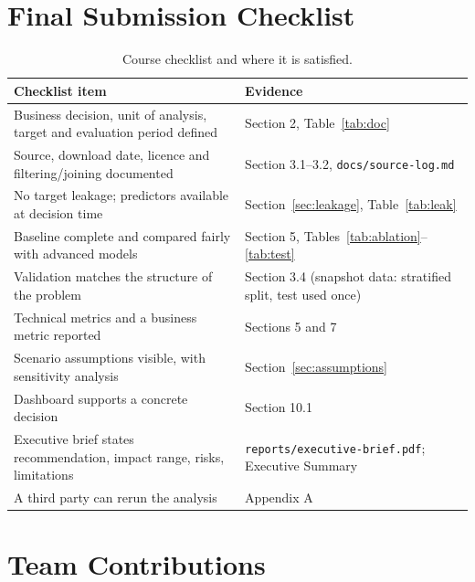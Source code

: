 \documentclass[11pt,a4paper]{article}
\begin{document}
\section{Final Submission Checklist}

\begin{table}[H]
\centering\small
\caption{Course checklist and where it is satisfied.}\label{tab:checklist}
\begin{tabularx}{\linewidth}{@{}Xp{6.4cm}@{}}
\toprule
\textbf{Checklist item} & \textbf{Evidence} \\
\midrule
Business decision, unit of analysis, target and evaluation period defined & Section 2, Table~\ref{tab:doc} \\
Source, download date, licence and filtering/joining documented & Section 3.1--3.2, \texttt{docs/source-log.md} \\
No target leakage; predictors available at decision time & Section~\ref{sec:leakage}, Table~\ref{tab:leak} \\
Baseline complete and compared fairly with advanced models & Section 5, Tables~\ref{tab:ablation}--\ref{tab:test} \\
Validation matches the structure of the problem & Section 3.4 (snapshot data: stratified split, test used once) \\
Technical metrics and a business metric reported & Sections 5 and 7 \\
Scenario assumptions visible, with sensitivity analysis & Section~\ref{sec:assumptions} \\
Dashboard supports a concrete decision & Section 10.1 \\
Executive brief states recommendation, impact range, risks, limitations & \texttt{reports/executive-brief.pdf}; Executive Summary \\
A third party can rerun the analysis & Appendix A \\
\bottomrule
\end{tabularx}
\end{table}

\section{Team Contributions}
\end{document}
